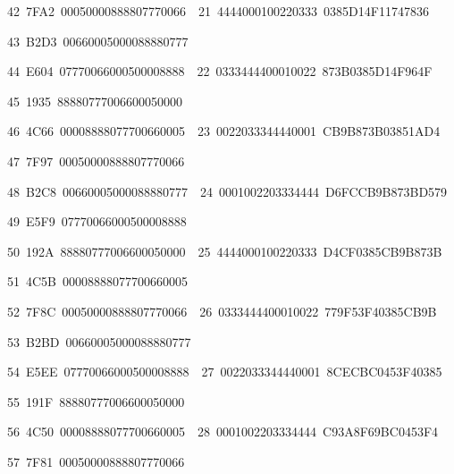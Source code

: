 \documentclass[a4paper,oneside,english]{amsart}
\numberwithin{equation}{section}
\numberwithin{figure}{section}
\newenvironment{lyxcode}
{\par\begin{list}{}{
\setlength{\rightmargin}{\leftmargin}
\setlength{\listparindent}{0pt}\raggedright
\setlength{\itemsep}{0pt}
\setlength{\parsep}{0pt}
\normalfont\ttfamily}\item[]}
{\end{list}}
\begin{document}
\begin{table}
\begin{lyxcode}
{\footnotesize{}~42~7FA2~00050000888807770066~~21~4444000100220333~0385D14F11747836}{\footnotesize \par}

{\footnotesize{}~43~B2D3~00660005000088880777}{\footnotesize \par}

{\footnotesize{}~44~E604~07770066000500008888~~22~0333444400010022~873B0385D14F964F}{\footnotesize \par}

{\footnotesize{}~45~1935~88880777006600050000}{\footnotesize \par}

{\footnotesize{}~46~4C66~00008888077700660005~~23~0022033344440001~CB9B873B03851AD4}{\footnotesize \par}

{\footnotesize{}~47~7F97~00050000888807770066}{\footnotesize \par}

{\footnotesize{}~48~B2C8~00660005000088880777~~24~0001002203334444~D6FCCB9B873BD579}{\footnotesize \par}

{\footnotesize{}~49~E5F9~07770066000500008888}{\footnotesize \par}

{\footnotesize{}~50~192A~88880777006600050000~~25~4444000100220333~D4CF0385CB9B873B}{\footnotesize \par}

{\footnotesize{}~51~4C5B~00008888077700660005}{\footnotesize \par}

{\footnotesize{}~52~7F8C~00050000888807770066~~26~0333444400010022~779F53F40385CB9B}{\footnotesize \par}

{\footnotesize{}~53~B2BD~00660005000088880777}{\footnotesize \par}

{\footnotesize{}~54~E5EE~07770066000500008888~~27~0022033344440001~8CECBC0453F40385}{\footnotesize \par}

{\footnotesize{}~55~191F~88880777006600050000}{\footnotesize \par}

{\footnotesize{}~56~4C50~00008888077700660005~~28~0001002203334444~C93A8F69BC0453F4}{\footnotesize \par}

{\footnotesize{}~57~7F81~00050000888807770066}{\footnotesize \par}


\end{lyxcode}
\end{table}
\end{document}
